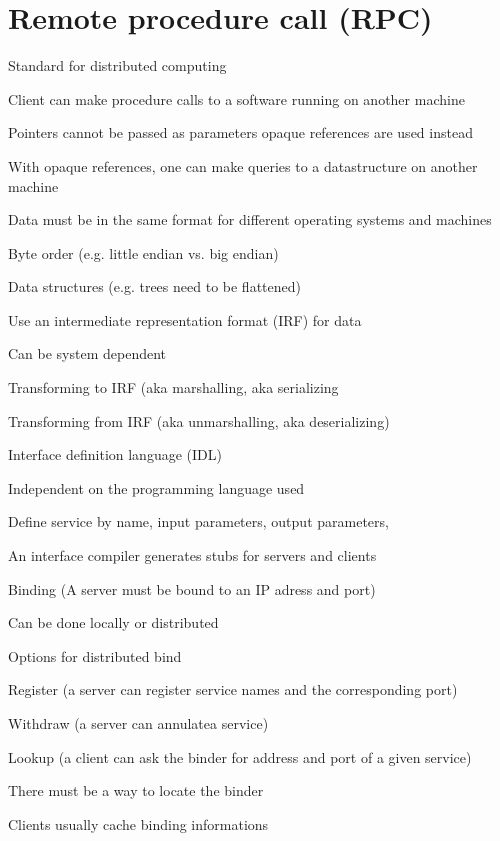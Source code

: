 \section{Remote procedure call (RPC)}
\enumstart
	\item Standard for distributed computing
	\item Client can make procedure calls to a software running on another machine
	\item Pointers cannot be passed as parameters \arrow opaque references are used instead
	\item With opaque references, one can make queries to a datastructure on another machine
	\item Data must be in the same format for different operating systems and machines
	\enumstart
		\item Byte order (e.g. little endian vs. big endian)
		\item Data structures (e.g. trees need to be flattened)
	\enumend
	\item  Use an intermediate representation format (IRF) for data
	\enumstart
		\item Can be system dependent
		\item Transforming to IRF (aka marshalling, aka serializing
		\item Transforming from IRF (aka unmarshalling, aka deserializing)
	\enumend
	\item Interface definition language (IDL)
	\enumstart
		\item Independent on the programming language used
		\item Define service by name, input parameters, output parameters, \ddd
		\item An interface compiler generates stubs for servers and clients
	\enumend
	\item Binding (A server must be bound to an IP adress and port)
	\enumstart
		\item Can be done locally or distributed
		\item Options for distributed bind
		\enumstart
			\item Register (a server can register service names and the corresponding port)
			\item Withdraw (a server can annulatea service)
			\item Lookup (a client can ask the binder for address and port of a given service)
		\enumend
		\item There must be a way to locate the binder
		\item Clients usually cache binding informations
